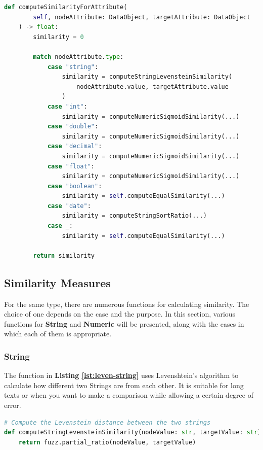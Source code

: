 \begin{lstlisting}[language=Python, caption=Function to Compute the Similarity Value Between Two Attributes, label={lst:comp-sim-att}]
def computeSimilarityForAttribute(
        self, nodeAttribute: DataObject, targetAttribute: DataObject
    ) -> float:
        similarity = 0

        match nodeAttribute.type:
            case "string":
                similarity = computeStringLevensteinSimilarity(
                    nodeAttribute.value, targetAttribute.value
                )
            case "int":
                similarity = computeNumericSigmoidSimilarity(...)
            case "double":
                similarity = computeNumericSigmoidSimilarity(...)
            case "decimal":
                similarity = computeNumericSigmoidSimilarity(...)
            case "float":
                similarity = computeNumericSigmoidSimilarity(...)
            case "boolean":
                similarity = self.computeEqualSimilarity(...)
            case "date":
                similarity = computeStringSortRatio(...)
            case _:
                similarity = self.computeEqualSimilarity(...)

        return similarity
\end{lstlisting}
    

\subsection{Similarity Measures}
For the same type, there are numerous functions for calculating similarity. The choice of one depends on the case and the purpose. In this section, various functions for \textbf{String} and \textbf{Numeric} will be presented, along with the cases in which each of them is appropriate.
    
    \subsubsection{String}
    The function in \textbf{Listing \ref{lst:leven-string}} uses Levenshtein's algorithm to calculate how different two Strings are from each other. It is suitable for long texts or when you want to make a comparison while allowing a certain degree of error.\\
    
\begin{lstlisting}[language=Python, caption=Levenstein Distance Between Two Strings, label={lst:leven-string}]
# Compute the Levenstein distance between the two strings
def computeStringLevensteinSimilarity(nodeValue: str, targetValue: str) -> float:
    return fuzz.partial_ratio(nodeValue, targetValue)
\end{lstlisting}
    
